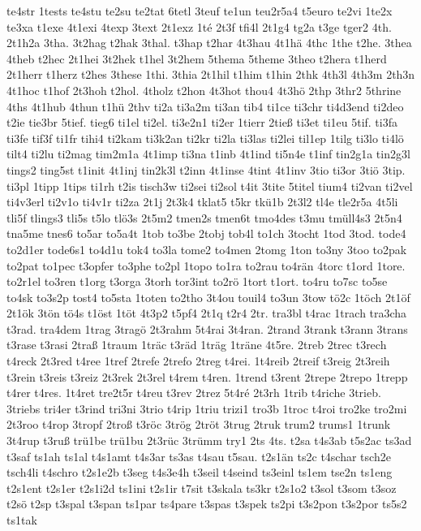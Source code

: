 {te4str
1tests
te4stu
te2su
te2tat
6tetl
3teuf
te1un
teu2r5a4
t5euro
te2vi
1te2x
te3xa
t1exe
4t1exi
4texp
3text
2t1exz
1té
2t3f
tfi4l
2t1g4
tg2a
t3ge
tger2
4th.
2t1h2a
3tha.
3t2hag
t2hak
3thal.
t3hap
t2har
4t3hau
4t1hä
4thc
1the
t2he.
3thea
4theb
t2hec
2t1hei
3t2hek
t1hel
3t2hem
5thema
5theme
3theo
t2hera
t1herd
2t1herr
t1herz
t2hes
3these
1thi.
3thia
2t1hil
t1him
t1hin
2thk
4th3l
4th3m
2th3n
4t1hoc
t1hof
2t3hoh
t2hol.
4tholz
t2hon
4t3hot
thou4
4t3hö
2thp
3thr2
5thrine
4ths
4t1hub
4thun
t1hü
2thv
ti2a
ti3a2m
ti3an
tib4
ti1ce
ti3chr
ti4d3end
ti2deo
t2ie
tie3br
5tief.
tieg6
ti1el
ti2el.
ti3e2n1
ti2er
1tierr
2tieß
ti3et
ti1eu
5tif.
ti3fa
ti3fe
tif3f
ti1fr
tihi4
ti2kam
ti3k2an
ti2kr
ti2la
ti3las
ti2lei
til1ep
1tilg
ti3lo
ti4lö
tilt4
ti2lu
ti2mag
tim2m1a
4t1imp
ti3na
t1inb
4t1ind
ti5n4e
t1inf
tin2g1a
tin2g3l
tings2
ting5st
t1init
4t1inj
tin2k3l
t2inn
4t1inse
4tint
4t1inv
3tio
ti3or
3tiö
3tip.
ti3pl
1tipp
1tips
ti1rh
t2is
tisch3w
ti2sei
ti2sol
t4it
3tite
5titel
tium4
ti2van
ti2vel
ti4v3erl
ti2v1o
ti4v1r
ti2za
2t1j
2t3k4
tklat5
t5kr
tkü1b
2t3l2
tl4e
tle2r5a
4t5li
tli5f
tlings3
tli5s
t5lo
tlö3s
2t5m2
tmen2s
tmen6t
tmo4des
t3mu
tmüll4s3
2t5n4
tna5me
tnes6
to5ar
to5a4t
1tob
to3be
2tobj
tob4l
to1ch
3tocht
1tod
3tod.
tode4
to2d1er
tode6s1
to4d1u
tok4
to3la
tome2
to4men
2tomg
1ton
to3ny
3too
to2pak
to2pat
to1pec
t3opfer
to3phe
to2pl
1topo
to1ra
to2rau
to4rän
4torc
t1ord
1tore.
to2r1el
to3ren
t1org
t3orga
3torh
tor3int
to2rö
1tort
t1ort.
to4ru
to7sc
to5se
to4sk
to3s2p
tost4
to5sta
1toten
to2tho
3t4ou
touil4
to3un
3tow
tö2c
1töch
2t1öf
2t1ök
3tön
tö4s
t1öst
1töt
4t3p2
t5pf4
2t1q
t2r4
2tr.
tra3bl
t4rac
1trach
tra3cha
t3rad.
tra4dem
1trag
3tragö
2t3rahm
5t4rai
3t4ran.
2trand
3trank
t3rann
3trans
t3rase
t3rasi
2traß
1traum
1träc
t3räd
1träg
1träne
4t5re.
2treb
2trec
t3rech
t4reck
2t3red
t4ree
1tref
2trefe
2trefo
2treg
t4rei.
1t4reib
2treif
t3reig
2t3reih
t3rein
t3reis
t3reiz
2t3rek
2t3rel
t4rem
t4ren.
1trend
t3rent
2trepe
2trepo
1trepp
t4rer
t4res.
1t4ret
tre2t5r
t4reu
t3rev
2trez
5t4ré
2t3rh
1trib
t4riche
3trieb.
3triebs
tri4er
t3rind
tri3ni
3trio
t4rip
1triu
trizi1
tro3b
1troc
t4roi
tro2ke
tro2mi
2t3roo
t4rop
3tropf
2troß
t3röc
3trög
2tröt
3trug
2truk
trum2
trums1
1trunk
3t4rup
t3ruß
trü1be
trü1bu
2t3rüc
3trümm
try1
2ts
4ts.
t2sa
t4s3ab
t5s2ac
ts3ad
t3saf
ts1ah
ts1al
t4s1amt
t4s3ar
ts3as
t4sau
t5sau.
t2s1än
ts2c
t4schar
tsch2e
tsch4li
t4schro
t2s1e2b
t3seg
t4s3e4h
t3seil
t4seind
ts3einl
ts1em
tse2n
ts1eng
t2s1ent
t2s1er
t2s1i2d
ts1ini
t2s1ir
t7sit
t3skala
ts3kr
t2s1o2
t3sol
t3som
t3soz
t2sö
t2sp
t3spal
t3span
ts1par
ts4pare
t3spas
t3spek
ts2pi
t3s2pon
t3s2por
ts5s2
ts1tak
}
